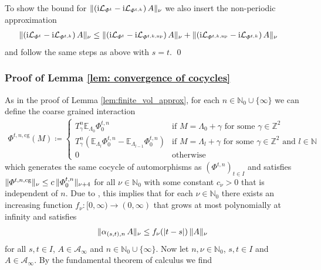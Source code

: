 \documentclass[a4paper]{article}
\newcommand{\E}{\mathbb{E}}
\renewcommand{\i}{\mathrm{i}}
\renewcommand{\Phi}{\varPhi}
\newcommand{\g}{\gamma}
\newcommand{\La}{\Lambda}
\newcommand{\N}{\mathbb{N}}
\newcommand{\Z}{\mathbb{Z}}
\newcommand{\mA}{\mathcal{A}}
\newcommand{\mL}{\mathcal{L}}
\DeclarePairedDelimiter\norm{\lVert}{\rVert}
\DeclarePairedDelimiter\abs{\lvert}{\rvert}
\theoremstyle{plain}
\theoremstyle{definition}
\theoremstyle{remark}
\renewcommand{\(}{\left(}
\renewcommand{\)}{\right)}
\begin{document}
    To show the bound for $\norm{(\i\mL_{\Phi^t} - \i\mL_{\Phi^{t,k}})\, A}_\nu$ we also insert the non-periodic approximation 
    \begin{align*}
        \norm{(\i\mL_{\Phi^t} - \i\mL_{\Phi^{t,k}})\, A}_\nu
        &\leq
        \norm{(\i\mL_{\Phi^t} - \i\mL_{\Phi^{t,k,\mathrm{np}}})\, A}_\nu + \norm{(\i\mL_{\Phi^{t,k,\mathrm{np}}} - \i\mL_{\Phi^{t,k}})\, A}_\nu
    \end{align*}
    and follow the same steps as above with $s=t$.
    \qed




 

\subsubsection{Proof of Lemma \ref{lem: convergence of cocycles}}\label{proof: convergence of cocycles}
    As in the proof of Lemma \ref{lem:finite_vol_approx}, for each $n\in \N_0\cup \{\infty\}$ we can define the coarse grained interaction 
    \begin{align*}
        \Phi^{t,n,\mathrm{cg}}(M) \coloneq
        \left\{\begin{array}{cl}
        T^n_{\g}\E_{\La_{0}}\Phi^{t,n}_0 & 
        \mbox{if  $M=\La_0 +\g$ for some $\g\in \Z^2$}\\
        T^n_{\g}(\E_{\La_{l}}\Phi^{t,n}_0 - \E_{\La_{l-1}}\Phi^{t,n}_0)&
        \mbox{if  $M=\La_l +\g$ for some $\g\in \Z^2$ and $l\in\N$}\\
        0 & \mbox{otherwise}
        \end{array}
        \right
        .
    \end{align*}
    which generates the same cocycle of automorphisms as $(\Phi^{t,n})_{t\in I}$ and satisfies $\norm{\Phi^{t,n,\mathrm{cg}}}_\nu \leq c\, \norm{\Phi^{t,n}_0}_{\nu+4}$ for all $\nu\in \N_0$ with some constant $c_\nu>0$ that is independent of $n$.
    Due to \cite[Lemma 2.10]{BTW26automorphic}, this implies that for each $\nu \in \N_0$ there exists an increasing function $f_\nu \colon [0,\infty) \to (0,\infty)$ that grows at most polynomially at infinity and satisfies
    \begin{align*}
        \norm{ \alpha_{(s,t),n} \, A }_\nu \leq f_\nu(\abs{t-s})\, \norm{ A }_\nu 
    \end{align*}
    for all $s,t\in I$, $A\in \mA_\infty$ and $n \in \N_0 \cup \{\infty\}$. Now let $n,\nu\in \N_0$, $s,t\in I$ and $A\in \mA_\infty$. By the fundamental theorem of calculus we find
\end{document}
